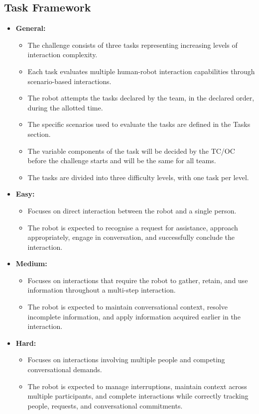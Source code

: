 \subsection*{Task Framework}
\begin{itemize}
	\item \textbf{General:}
	\begin{itemize}
		\item The challenge consists of three tasks representing increasing levels of interaction complexity.
		\item Each task evaluates multiple human-robot interaction capabilities through scenario-based interactions.
		\item The robot attempts the tasks declared by the team, in the declared order, during the allotted time.
		\item The specific scenarios used to evaluate the tasks are defined in the Tasks section.
		\item The variable components of the task will be decided by the TC/OC before the challenge starts and will be the same for all teams.
		\item The tasks are divided into three difficulty levels, with one task per level.
	\end{itemize}
	\item \textbf{Easy:}
	\begin{itemize}
		\item Focuses on direct interaction between the robot and a single person.
		\item The robot is expected to recognise a request for assistance, approach appropriately, engage in conversation, and successfully conclude the interaction.
	\end{itemize}
	\item \textbf{Medium:}
	\begin{itemize}
		\item Focuses on interactions that require the robot to gather, retain, and use information throughout a multi-step interaction.
		\item The robot is expected to maintain conversational context, resolve incomplete information, and apply information acquired earlier in the interaction.
	\end{itemize}
	\item \textbf{Hard:}
	\begin{itemize}
		\item Focuses on interactions involving multiple people and competing conversational demands.
		\item The robot is expected to manage interruptions, maintain context across multiple participants, and complete interactions while correctly tracking people, requests, and conversational commitments.
	\end{itemize}
\end{itemize}

